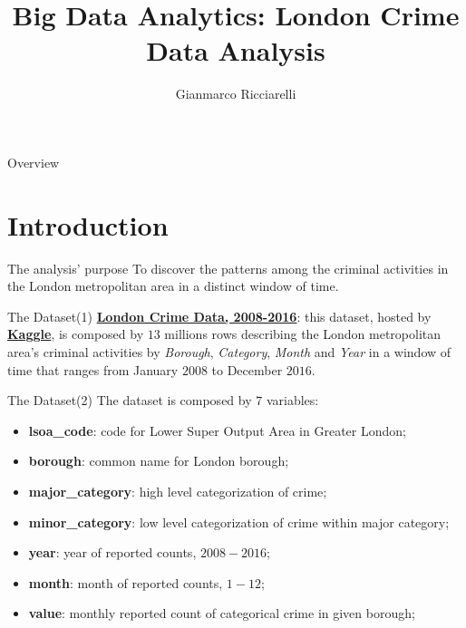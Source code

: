 \documentclass[12pt]{beamer}
\title{Big Data Analytics: London Crime Data Analysis}
\author{Gianmarco Ricciarelli\inst{1}}
\institute{\inst{1}University of Pisa, \\
           \email{gianmarcoricciarelli@gmail.com}}
\date{}
\begin{document}
    \maketitle

    \begin{frame}{Overview}
        \tableofcontents
    \end{frame}

    \section{Introduction} %
    \label{sec:introduction}
        \begin{frame}{The analysis' purpose}
            To discover the patterns among the criminal activities in the London metropolitan area in a
            distinct window of time.
        \end{frame}

        \begin{frame}{The Dataset(1)}
            \href{https://www.kaggle.com/jboysen/london-crime}{\textbf{London Crime Data, 2008-2016}}: this
            dataset, hosted by \href{https://www.kaggle.com}{\textbf{Kaggle}}, is composed by $13$
            millions rows describing the London metropolitan area's criminal activities by \textit{Borough},
            \textit{Category}, \textit{Month} and \textit{Year} in a window of time that ranges from
            January $2008$ to December $2016$.
        \end{frame}

        \begin{frame}{The Dataset(2)}
            The dataset is composed by $7$ variables:

            \begin{itemize}
                \item \textbf{lsoa\_code}: code for Lower Super Output Area in Greater London;
                \item \textbf{borough}: common name for London borough;
                \item \textbf{major\_category}: high level categorization of crime;
                \item \textbf{minor\_category}: low level categorization of crime within major category;
                \item \textbf{year}: year of reported counts, $2008-2016$;
                \item \textbf{month}: month of reported counts, $1-12$;
                \item \textbf{value}: monthly reported count of categorical crime in given borough;
            \end{itemize}
        \end{frame}
\end{document}
